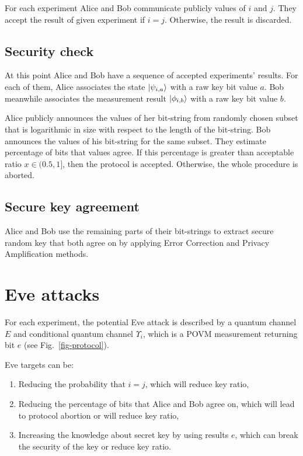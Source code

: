 \documentclass[12pt,a4paper,reqno, aps, superscriptaddress]{amsart}
\begin{document}
For each experiment Alice and Bob communicate publicly values of $i$ and $j$. 
They accept the result of given experiment if $i=j$. Otherwise, the result is 
discarded. 

\subsection{Security check}
At this point Alice and Bob have a sequence of accepted experiments' results. 
For each of them, Alice associates the state $\ket{\psi_{i,a}}$ with a raw key 
bit 
value $a$. Bob meanwhile associates the measurement result $\ket{\phi_{i,b}}$ 
with a 
raw key bit value $b$.

Alice publicly announces the values of her bit-string from randomly chosen 
subset that is logarithmic in size with respect to the length of the bit-string.
Bob announces the values of his bit-string for the same subset. They estimate 
percentage of bits that values agree. If this percentage is greater than 
acceptable 
ratio $x \in (0.5,1]$, then the protocol is accepted. Otherwise, the whole 
procedure is aborted.

\subsection{Secure key agreement}
Alice and Bob use the remaining parts of their 
bit-strings to extract secure random key that both agree on by applying Error 
Correction and Privacy Amplification methods.


\section{Eve attacks}

For each experiment, the potential Eve attack is described 
by a quantum channel $E$ and conditional quantum channel $\Upsilon_{i}$, which 
is a POVM measurement returning bit $e$ (see 
Fig.~\ref{fig-protocol}).

Eve targets can be:
\begin{enumerate}
    \item Reducing the probability that $i=j$, which will reduce key ratio,
    \item Reducing the percentage of bits that Alice and Bob agree on, which 
    will lead to protocol abortion or will reduce key ratio,
    \item Increasing the knowledge about secret key by using results $e$, which 
    can break the security of the key or reduce key ratio.
\end{enumerate}
\end{document}
